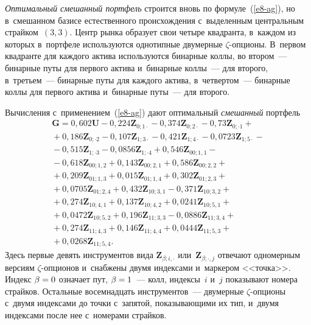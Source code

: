 \begin{multicols}{2}
  \textit{Оптимальный смешанный портфель} строится вновь по 
формуле~(\ref{e8-ag}), но в~смешанном базисе естественного происхождения 
с~выделенным центральным страйком~$(3, 3)$. Центр рынка образует свои 
четыре квадранта, в~каждом из которых в~портфеле используются однотипные 
двумерные $\zeta$-оп\-ци\-о\-ны. В~первом квадранте для каждого актива 
используются бинарные коллы, во втором~--- бинарные путы для первого 
актива и~бинарные коллы~--- для второго, в~третьем~--- бинарные путы для 
каждого актива, в~четвертом~--- бинарные коллы для первого актива 
и~бинарные путы~--- для второго. 
  
  Вычисления с~применением~(\ref{e8-ag}) дают оптимальный 
\textit{смешанный} портфель 
\begin{multline*}
  \boldsymbol{G} = 0{,}602 \boldsymbol{U} - 0{,}224 \boldsymbol{Z}_{0;1\cdot} - 0{,}374\boldsymbol{Z}_{0;2\cdot} - 
  0{,}73 \boldsymbol{Z}_{0;\cdot 1} + {}\\
{}+0{,}186 \boldsymbol{Z}_{0;\cdot 2} - 0{,}107 \boldsymbol{Z}_{1;3\cdot} - 0{,}421 \boldsymbol{Z}_{1;4\cdot} 
- 0{,}0723 \boldsymbol{Z}_{1;5\cdot} -{}\\
{}- 0{,}515\boldsymbol{Z}_{1;\cdot 3} - 0{,}0856\boldsymbol{ Z}_{1;\cdot 4} + 0{,}546 \boldsymbol{Z}_{00;1,1} -{}\\
{}- 0{,}618 \boldsymbol{Z}_{00;1,2} + 0{,}143 \boldsymbol{Z}_{00;2,1} + 0{,}586 \boldsymbol{Z}_{00;2,2} +{}\\
{}+ 0{,}209 \boldsymbol{Z}_{01;1,3} + 0{,}015 \boldsymbol{Z}_{01;1,4} + 0{,}302 \boldsymbol{Z}_{01;2,3} + {}\\
{}+0{,}0705 \boldsymbol{Z}_{01;2,4} + 0{,}432 \boldsymbol{Z}_{10;3,1} - 0{,}371\boldsymbol{Z}_{10;3,2} +{}\\
{}+ 0{,}274 \boldsymbol{Z}_{10;4,1} + 0{,}137\boldsymbol{Z}_{10;4,2} + 0{,}0241 \boldsymbol{Z}_{10;5,1} + {}\\
{}+0{,}0472\boldsymbol{Z}_{10;5,2} + 0{,}196 \boldsymbol{Z}_{11;3,3} - 0{,}0886 \boldsymbol{Z}_{11;3,4} +{}\\
{}+ 0{,}274 \boldsymbol{Z}_{11;4,3} + 0{,}146 \boldsymbol{Z}_{11;4,4} + 0{,}0444 \boldsymbol{Z}_{11;5,3} +{}\\
{}+ 0{,}0268 \boldsymbol{Z}_{11;5,4}. 
\end{multline*}
  Здесь первые девять инструментов вида $\boldsymbol{Z}_{\beta;i,\cdot}$ 
или~$\boldsymbol{Z}_{\beta;\cdot,j}$ отвечают одномерным версиям  
$\zeta$-оп\-ци\-о\-нов и~снабжены двумя индексами и~маркером <<точка>>. 
Индекс $\beta\hm=0$ означает пут, $\beta\hm = 1$~--- колл, индексы~$i$ и~$j$ 
показывают номера страйков. Остальные восемнадцать инструментов~--- 
двумерные $\zeta$-оп\-ци\-о\-ны с~двумя индексами до точки с~запятой, 
показывающими их тип, и~двумя индексами после нее с~номерами страйков. 
  

\end{multicols}
